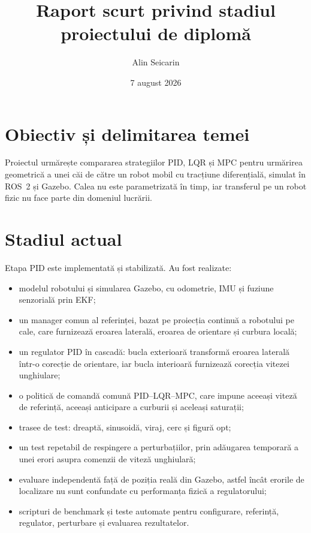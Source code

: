 \documentclass[11pt,a4paper]{article}
\title{Raport scurt privind stadiul proiectului de diplomă}
\author{Alin Seicarin}
\date{7 august 2026}
\begin{document}
\maketitle

\section*{Obiectiv și delimitarea temei}

Proiectul urmărește compararea strategiilor PID, LQR și MPC pentru urmărirea
geometrică a unei căi de către un robot mobil cu tracțiune diferențială, simulat
în ROS~2 și Gazebo. Calea nu este parametrizată în timp, iar transferul pe un
robot fizic nu face parte din domeniul lucrării.

\section*{Stadiul actual}

Etapa PID este implementată și stabilizată. Au fost realizate:

\begin{itemize}
    \item modelul robotului și simularea Gazebo, cu odometrie, IMU și fuziune
    senzorială prin EKF;
    \item un manager comun al referinței, bazat pe proiecția continuă a
    robotului pe cale, care furnizează eroarea laterală, eroarea de orientare și
    curbura locală;
    \item un regulator PID în cascadă: bucla exterioară transformă eroarea
    laterală într-o corecție de orientare, iar bucla interioară furnizează
    corecția vitezei unghiulare;
    \item o politică de comandă comună PID--LQR--MPC, care impune aceeași viteză
    de referință, aceeași anticipare a curburii și aceleași saturații;
    \item trasee de test: dreaptă, sinusoidă, viraj, cerc și figură opt;
    \item un test repetabil de respingere a perturbațiilor, prin adăugarea
    temporară a unei erori asupra comenzii de viteză unghiulară;
    \item evaluare independentă față de poziția reală din Gazebo, astfel încât
    erorile de localizare nu sunt confundate cu performanța fizică a
    regulatorului;
    \item scripturi de benchmark și teste automate pentru configurare,
    referință, regulator, perturbare și evaluarea rezultatelor.
\end{itemize}
\end{document}
